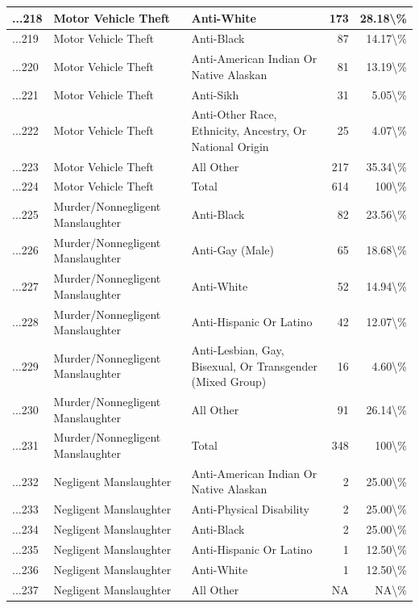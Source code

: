 \documentclass[
]{krantz}
\begin{document}
\begin{longtable}[t]{l|l|l|r|r}
...218 & Motor Vehicle Theft & Anti-White & 173 & 28.18\textbackslash{}\%\\
\hline
...219 & Motor Vehicle Theft & Anti-Black & 87 & 14.17\textbackslash{}\%\\
\hline
...220 & Motor Vehicle Theft & Anti-American Indian Or Native Alaskan & 81 & 13.19\textbackslash{}\%\\
\hline
...221 & Motor Vehicle Theft & Anti-Sikh & 31 & 5.05\textbackslash{}\%\\
\hline
...222 & Motor Vehicle Theft & Anti-Other Race, Ethnicity, Ancestry, Or National Origin & 25 & 4.07\textbackslash{}\%\\
\hline
...223 & Motor Vehicle Theft & All Other & 217 & 35.34\textbackslash{}\%\\
\hline
...224 & Motor Vehicle Theft & Total & 614 & 100\textbackslash{}\%\\
\hline
...225 & Murder/Nonnegligent Manslaughter & Anti-Black & 82 & 23.56\textbackslash{}\%\\
\hline
...226 & Murder/Nonnegligent Manslaughter & Anti-Gay (Male) & 65 & 18.68\textbackslash{}\%\\
\hline
...227 & Murder/Nonnegligent Manslaughter & Anti-White & 52 & 14.94\textbackslash{}\%\\
\hline
...228 & Murder/Nonnegligent Manslaughter & Anti-Hispanic Or Latino & 42 & 12.07\textbackslash{}\%\\
\hline
...229 & Murder/Nonnegligent Manslaughter & Anti-Lesbian, Gay, Bisexual, Or Transgender (Mixed Group) & 16 & 4.60\textbackslash{}\%\\
\hline
...230 & Murder/Nonnegligent Manslaughter & All Other & 91 & 26.14\textbackslash{}\%\\
\hline
...231 & Murder/Nonnegligent Manslaughter & Total & 348 & 100\textbackslash{}\%\\
\hline
...232 & Negligent Manslaughter & Anti-American Indian Or Native Alaskan & 2 & 25.00\textbackslash{}\%\\
\hline
...233 & Negligent Manslaughter & Anti-Physical Disability & 2 & 25.00\textbackslash{}\%\\
\hline
...234 & Negligent Manslaughter & Anti-Black & 2 & 25.00\textbackslash{}\%\\
\hline
...235 & Negligent Manslaughter & Anti-Hispanic Or Latino & 1 & 12.50\textbackslash{}\%\\
\hline
...236 & Negligent Manslaughter & Anti-White & 1 & 12.50\textbackslash{}\%\\
\hline
...237 & Negligent Manslaughter & All Other & NA & NA\textbackslash{}\%\\

\end{longtable}
\end{document}
